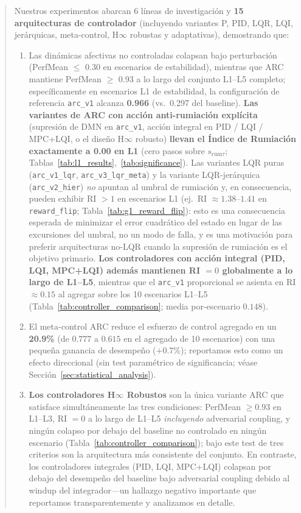 \documentclass{article}
\begin{document}
\begin{abstract}
Nuestros experimentos abarcan 6 líneas de investigación y \textbf{15 arquitecturas de controlador} (incluyendo variantes P, PID, LQR, LQI, jerárquicas, meta-control, H$\infty$ robustas y adaptativas), demostrando que:
\begin{enumerate}
    \item Las dinámicas afectivas no controladas colapsan bajo perturbación (PerfMean $\leq$ 0.30 en escenarios de estabilidad), mientras que ARC mantiene PerfMean $\geq$ 0.93 a lo largo del conjunto L1--L5 completo; específicamente en escenarios L1 de estabilidad, la configuración de referencia \texttt{arc\_v1} alcanza \textbf{0.966} (vs.\ 0.297 del baseline). \textbf{Las variantes de ARC con acción anti-rumiación explícita} (supresión de DMN en \texttt{arc\_v1}, acción integral en PID / LQI / MPC+LQI, o el diseño H$\infty$ robusto) \textbf{llevan el Índice de Rumiación exactamente a 0.00 en L1} (cero pasos sobre $s_{\text{rum}\tau}$; Tablas~\ref{tab:l1_results},~\ref{tab:significance}). Las variantes LQR puras (\texttt{arc\_v1\_lqr}, \texttt{arc\_v3\_lqr\_meta}) y la variante LQR-jerárquica (\texttt{arc\_v2\_hier}) \emph{no} apuntan al umbral de rumiación y, en consecuencia, pueden exhibir RI $>1$ en escenarios L1 (ej.\ RI $\approx 1.38$--$1.41$ en \texttt{reward\_flip}; Tabla~\ref{tab:g1_reward_flip}): esto es una consecuencia esperada de minimizar el error cuadrático del estado en lugar de las excursiones del umbral, no un modo de falla, y es una motivación para preferir arquitecturas no-LQR cuando la supresión de rumiación es el objetivo primario. \textbf{Los controladores con acción integral (PID, LQI, MPC+LQI) además mantienen RI $= 0$ globalmente a lo largo de L1--L5}, mientras que el \texttt{arc\_v1} proporcional se asienta en RI $\approx 0.15$ al agregar sobre los 10 escenarios L1--L5 (Tabla~\ref{tab:controller_comparison}; media por-escenario $0.148$).
    \item El meta-control ARC reduce el esfuerzo de control agregado en un \textbf{20.9\%} (de $0.777$ a $0.615$ en el agregado de 10 escenarios) con una pequeña ganancia de desempeño ($+0.7\%$); reportamos esto como un efecto direccional (sin test paramétrico de significancia; véase Sección~\ref{sec:statistical_analysis}).
    \item \textbf{Los controladores H$\infty$ Robustos} son la única variante ARC que satisface simultáneamente las tres condiciones: PerfMean $\geq 0.93$ en L1--L3, RI $= 0$ a lo largo de L1--L5 \emph{incluyendo} adversarial coupling, y ningún colapso por debajo del baseline no controlado en ningún escenario (Tabla~\ref{tab:controller_comparison}); bajo este test de tres criterios son la arquitectura más consistente del conjunto. En contraste, los controladores integrales (PID, LQI, MPC+LQI) colapsan por debajo del desempeño del baseline bajo adversarial coupling debido al windup del integrador---un hallazgo negativo importante que reportamos transparentemente y analizamos en detalle.

\end{enumerate}
\end{abstract}
\end{document}
